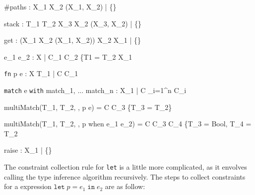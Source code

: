 \documentclass{article}
\begin{document}
    {\Gamma \vdash \#paths : X_1 \rightarrow X_2 \rightarrow (X_1, X_2) \; | \; \{\}}

    {\Gamma \vdash stack : T_1 \rightarrow T_2 \rightarrow X_3 \rightarrow X_2 \rightarrow (X_3, X_2)  \; | \; \{\}}

    {\Gamma \vdash get : (X_1 \rightarrow X_2 \rightarrow (X_1, X_2)) \rightarrow X_2 \rightarrow X_1  \; | \; \{\}}

    {\Gamma \vdash e_1 \; e_2 : X \; | \; C_1 \cup C_2 \cup \{T1 = T_2 \rightarrow X_1}

    {\Gamma \vdash \texttt{fn} \; p \Rightarrow e : X \rightarrow T_1 \; | \; C \cup C_1}

    {\Gamma \vdash \texttt{match} \; e \; \texttt{with} \; match_1, ... \; match_n : X_1 \; | \; C \cup \displaystyle \bigcup_{i=1}^{n} C_i}

  {multiMatch(T_1, T_2, \Gamma, p \rightarrow e) = C \cup C_3 \cup \{T_3 = T_2\}}

  {multiMatch(T_1, T_2, \Gamma, p \; \mbox{when} \; e_1 \rightarrow e_2) = C \cup C_3 \cup C_4 \cup \{T_3 = Bool, T_4 = T_2}

    {\Gamma \vdash raise : X_1 \; | \; \{\}}

The constraint collection rule for \texttt{let} is a little more complicated, as it envolves calling the type inference algorithm recursively.
The steps to collect constraints for a expression $\texttt{let} \; p = e_1 \; \texttt{in} \; e_2$ are as follow:
\end{document}
